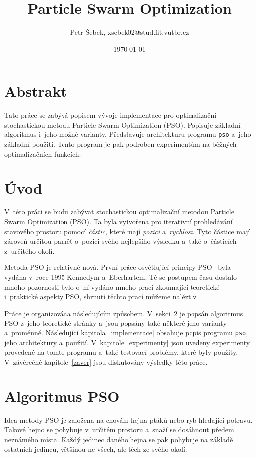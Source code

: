 \documentclass[12pt,a4paper,fleqn]{article}
\title{Particle Swarm Optimization}
\author{Petr Šebek, xsebek02@stud.fit.vutbr.cz}
\date{\today}
\begin{document}
\maketitle

\section*{Abstrakt}
Tato práce se zabývá popisem vývoje implementace pro optimalizační stochastickou metodu Particle Swarm Optimization (PSO). Popisuje základní algoritmus i~jeho možné varianty. Představuje architekturu programu \texttt{pso} a~jeho základní použití. Tento program je pak podroben experimentům na běžných optimalizačních funkcích.


\section{Úvod}
V~této práci se budu zabývat stochastickou optimalizační metodou Particle Swarm  Optimization (PSO). 
Ta byla vytvořena pro iterativní prohledávání stavového prostoru pomocí \textit{částic}, které mají \textit{pozici} a~\textit{rychlost}. Tyto částice mají zároveň určitou paměť o~pozici svého nejlepšího výsledku a~také o~částicích z~určitého okolí.

Metoda PSO je relativně nová. První práce osvětlující principy PSO~\cite{eberhat1995particle} byla vydána v~roce 1995 Kennedym a~Eberhartem. Té se postupem času dostalo mnoho pozornosti bylo o~ní vydáno mnoho prací zkoumající teoretické i~praktické aspekty PSO, shrnutí těchto prací můžeme nalézt v~\cite{poli2007particle}.

Práce je organizována následujícím způsobem. V~sekci~\ref{algoritmus_pso} je popsán algoritmus PSO z~jeho teoretické stránky a~jsou popsány také některé jeho varianty a~proměnné. Následující kapitola~\ref{implementace} obsahuje popis programu \texttt{pso}, jeho architektury a~použití. V~kapitole~\ref{experimenty} jsou uvedeny experimenty provedené na tomto programu a~také testovací problémy, které byly použity. V~závěrečné kapitole~\ref{zaver} jsou diskutovány výsledky této práce.

\newpage
\section{Algoritmus PSO} \label{algoritmus_pso}
Idea metody PSO je založena na chování hejna ptáků nebo ryb hledající potravu. Takové hejno se pohybuje v~určitém prostoru a~snaží se dosáhnout předem neznámého místa. Každý jedinec daného hejna se pak pohybuje na základě ostatních jedinců, většinou ne všech, ale těch ze svého okolí.
\end{document}
